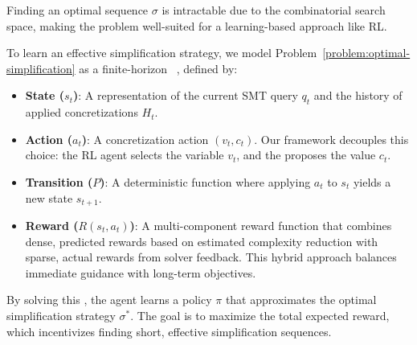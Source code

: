 Finding an optimal sequence $\sigma$ is intractable due to the combinatorial search space, making the problem well-suited for a learning-based approach like RL.


To learn an effective simplification strategy, we model Problem~\ref{problem:optimal-simplification} as a finite-horizon \MDP{}~\cite{sutton2018reinforcement}, defined by:
\begin{itemize}[leftmargin=*]
    \item \textbf{State ($s_t$)}: A representation of the current SMT query $q_t$ and the history of applied concretizations $H_t$.

    \item \textbf{Action ($a_t$)}: A concretization action $(v_t, c_t)$. Our framework decouples this choice: the RL agent selects the variable $v_t$, and the \LLM{} proposes the value $c_t$.

    \item \textbf{Transition ($P$)}: A deterministic function where applying $a_t$ to $s_t$ yields a new state $s_{t+1}$.
    
    \item \textbf{Reward ($R(s_t, a_t)$)}: A multi-component reward function that combines dense, predicted rewards based on estimated complexity reduction with sparse, actual rewards from solver feedback. This hybrid approach balances immediate guidance with long-term objectives.
\end{itemize}

By solving this \MDP{}, the agent learns a policy $\pi$ that approximates the optimal simplification strategy $\sigma^*$. The goal is to maximize the total expected reward, which incentivizes finding short, effective simplification sequences.
